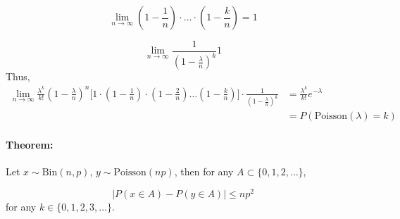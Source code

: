 \documentclass[letterpaper,12pt]{article}
\begin{document}
\begin{enumerate}
\[
    \lim_{n\to\infty}(1-\frac{1}{n})\cdot \ldots \cdot (1-\frac{k}{n}) = 1
\]

\[
    \lim_{n\to\infty} \frac{1}{(1-\frac{\lambda}{n})^k} 1
\]
Thus, 
\begin{align*}
    \lim_{n\to\infty} \frac{\lambda^k}{k!} (1-\frac{\lambda}{n})^n \bigg[1\cdot
              (1-\frac{1}{n})\cdot(1-\frac{2}{n}) \ldots (1-\frac{k}{n})\bigg] \cdot \frac{1}{(1-\frac{\lambda}{n})^k}
              &= \frac{\lambda^k}{k!}e^{-\lambda}\\
              &= P( \mathrm{Poisson}(\lambda) = k)
\end{align*}

\paragraph{Theorem:} Let $x \sim \mathrm{Bin}(n,p)$, $y \sim \mathrm{Poisson}(np)$, then for any
$A \subset \{0,1,2,\ldots\}$,

\[
    \lvert P(x \in A) - P(y \in A)\rvert \leq np^2
    \] for any $k \in \{0,1,2,3,\ldots\}$.
\end{enumerate}
\end{document}
